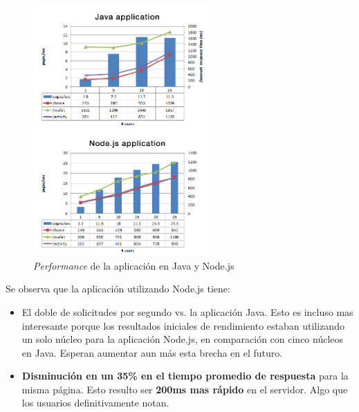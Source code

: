 \begin{figure}[h!]
	\centering
	\includegraphics[width=0.6\textwidth]{figuras/cap2/java_nodejs_benchmark_paypal.png}
	\caption{\textit{Performance} de la aplicación en Java y Node.js}
	\label{figure:java_benchmark_paypal}
\end{figure}

Se observa que la aplicación utilizando Node.js tiene:

\begin{itemize}
\item El doble de solicitudes por segundo vs. la aplicación Java. Esto es incluso mas interesante porque los resultados iniciales de rendimiento estaban utilizando un solo núcleo para la aplicación Node.js, en comparación con cinco núcleos en Java. Esperan aumentar aun más esta brecha en el futuro.
\item \textbf{Disminución en un 35\% en el tiempo promedio de respuesta} para la misma página. Esto resulto ser \textbf{200ms mas rápido} en el servidor. Algo que los usuarios definitivamente notan.
\end{itemize}


